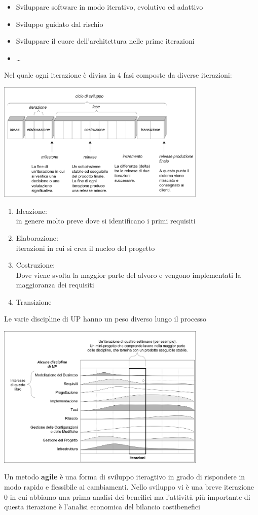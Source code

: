 \documentclass{article}
\begin{document}
\begin{itemize}
  \item Sviluppare software in modo iterativo, evolutivo ed adattivo
  \item Sviluppo guidato dal rischio
  \item Sviluppare il cuore dell'architettura nelle prime iterazioni
  \item \dots
\end{itemize}
Nel quale ogni iterazione è divisa in 4 fasi composte da diverse iterazioni:
\begin{center}
  \includegraphics[width=10cm]{images/fasi up.png}
\end{center}
\begin{enumerate}
  \item Ideazione:\\
        in genere molto preve dove si identificano i primi requisiti
  \item Elaborazione:\\
        iterazioni in cui si crea il nucleo del progetto
  \item Costruzione:\\
        Dove viene svolta la maggior parte del alvoro e vengono implementati la maggioranza dei requisiti
  \item Transizione
\end{enumerate}
Le varie discipline di UP hanno un peso diverso lungo il processo
\begin{center}
  \includegraphics[width=10cm]{images/discipline up nello sviluppo.png}
\end{center}
\newpage
Un metodo \textbf{agile} è una forma di sviluppo iteragtivo in grado di rispondere in modo rapido e flessibile ai cambiamenti.\acapo
Nello sviluppo vi è una breve iterazione 0 in cui abbiamo una prima analisi dei beneifici ma l'attività più importante di questa iterazione è l'analisi economica del bilancio costi\textendash benefici
\end{document}
